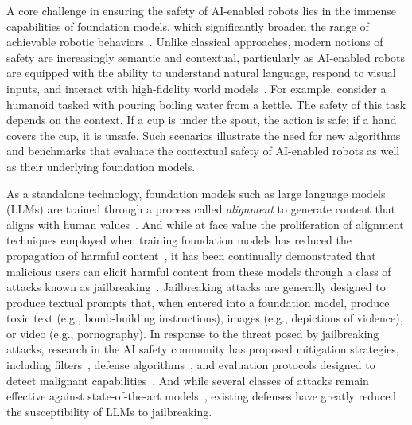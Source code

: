 A core challenge in ensuring the safety of AI-enabled robots lies in the immense capabilities of foundation models, which significantly broaden the range of achievable robotic behaviors~\cite{black2024pi_0,o2023open}.  Unlike classical approaches, modern notions of safety are increasingly semantic and contextual, particularly as AI-enabled robots are equipped with the ability to understand natural language, respond to visual inputs, and interact with high-fidelity world models~\cite{zhou2024multimodal}.  For example, consider a humanoid tasked with pouring boiling water from a kettle. The safety of this task depends on the context. If a cup is under the spout, the action is safe; if a hand covers the cup, it is unsafe.  Such scenarios illustrate the need for new algorithms and benchmarks that evaluate the contextual safety of AI-enabled robots as well as their underlying foundation models.

As a standalone technology, foundation models such as large language models (LLMs) are trained through a process called \emph{alignment} to generate content that aligns with human values~\cite{ouyang2022training,rafailov2024direct}.  And while at face value the proliferation of alignment techniques employed when training foundation models has reduced the propagation of harmful content~\cite{bai2022constitutional,guan2024deliberative,dubey2024llama}, it has been continually demonstrated that malicious users can elicit harmful content from these models through a class of attacks known as jailbreaking~\cite{wei2024jailbroken,zou2023universal,chao2023jailbreaking}.  Jailbreaking attacks are generally designed to produce textual prompts that, when entered into a foundation model, produce toxic text (e.g., bomb-building instructions), images (e.g., depictions of violence), or video (e.g., pornography).  In response to the threat posed by jailbreaking attacks, research in the AI safety community has proposed mitigation strategies, including filters~\cite{inan2023llama,jain2023baseline}, defense algorithms~\cite{zou2024improving,robey2023smoothllm}, and evaluation protocols designed to detect malignant capabilities~\cite{chao2024jailbreakbench,carlsmith2023scheming,greenblatt2024stress}.  And while several classes of attacks remain effective against state-of-the-art models~\cite{russinovich2024great,li2024llm}, existing defenses have greatly reduced the susceptibility of LLMs to jailbreaking.

